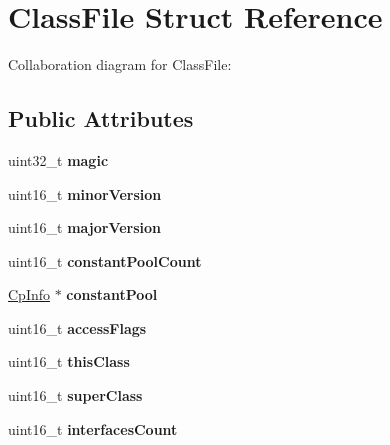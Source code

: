 \hypertarget{structClassFile}{}\section{Class\+File Struct Reference}
\label{structClassFile}


Collaboration diagram for Class\+File\+:
\subsection*{Public Attributes}
\begin{DoxyCompactItemize}
\item 
\mbox{\label{structClassFile_a9d4d72751ff9250dd3305d5d853f7921}} 
uint32\+\_\+t {\bfseries magic}
\item 
\mbox{\label{structClassFile_afb41e706bd0e19ed5a24cd0e99ecc4c1}} 
uint16\+\_\+t {\bfseries minor\+Version}
\item 
\mbox{\label{structClassFile_a3424e098e9ef6dbfbdbb9c708afaffe7}} 
uint16\+\_\+t {\bfseries major\+Version}
\item 
\mbox{\label{structClassFile_af185527e4689b1672655f608df4a3c62}} 
uint16\+\_\+t {\bfseries constant\+Pool\+Count}
\item 
\mbox{\label{structClassFile_a209de5f28c80fb453b37a3f0b320ab9c}} 
\hyperlink{structCpInfo}{Cp\+Info} $\ast$ {\bfseries constant\+Pool}
\item 
\mbox{\label{structClassFile_afbb2cd57bb6eb5baa34e83127e928c18}} 
uint16\+\_\+t {\bfseries access\+Flags}
\item 
\mbox{\label{structClassFile_abc02e661935c638b2f231cef576859f1}} 
uint16\+\_\+t {\bfseries this\+Class}
\item 
\mbox{\label{structClassFile_a306c9da73620fa5ad94bbaa64a19afdd}} 
uint16\+\_\+t {\bfseries super\+Class}
\item 
\mbox{\label{structClassFile_adcd02751a38d5b17559fd3c5201b2c42}} 
uint16\+\_\+t {\bfseries interfaces\+Count}

\end{DoxyCompactItemize}
